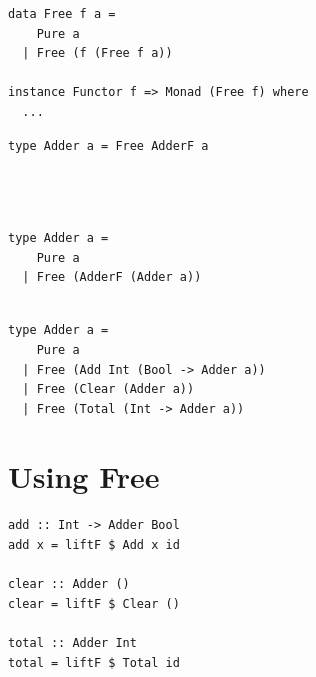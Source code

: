 \documentclass{beamer}
\begin{document}
\begin{frame}[fragile]
  \begin{verbatim}
data Free f a =
    Pure a
  | Free (f (Free f a))

instance Functor f => Monad (Free f) where
  ...
  \end{verbatim}
\end{frame}

\begin{frame}[fragile]
  \begin{overprint}
  \begin{verbatim}
type Adder a = Free AdderF a




  \end{verbatim}
  \begin{verbatim}
type Adder a =
    Pure a
  | Free (AdderF (Adder a))


  \end{verbatim}
  \begin{verbatim}
type Adder a =
    Pure a
  | Free (Add Int (Bool -> Adder a))
  | Free (Clear (Adder a))
  | Free (Total (Int -> Adder a))
  \end{verbatim}
  \end{overprint}
\end{frame}

\section{Using Free}

\begin{frame}[fragile]
  \begin{verbatim}
add :: Int -> Adder Bool
add x = liftF $ Add x id

clear :: Adder ()
clear = liftF $ Clear ()

total :: Adder Int
total = liftF $ Total id
  \end{verbatim}
\end{frame}
\end{document}
